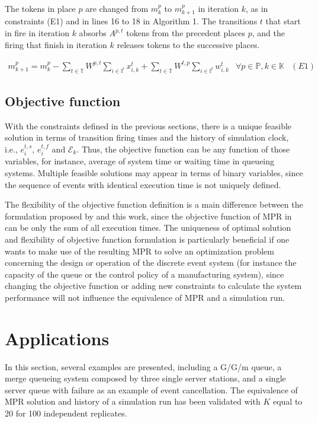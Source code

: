 \documentclass[suppldata]{interact}
\theoremstyle{plain}
\theoremstyle{definition}
\theoremstyle{remark}
\begin{document}
The tokens in place $p$ are changed from $m^{p}_{k}$ to $m^{p}_{k+1}$ in iteration $k$, as in constraints (E1) and in lines 16 to 18 in Algorithm 1. The transitions $t$ that start in fire in iteration $k$ absorbs $A^{p,t}$ tokens from the precedent places $p$, and the firing that finish in iteration $k$ releases tokens to the successive places. 

\begin{eqnarray}
	m^p_{k+1} = m^p_k - \sum_{t\in \mathbb{T}} W^{p,t} \sum_{i\in \mathbb{I}^{t}} x^t_{i,k} +  \sum_{t\in \mathbb{T}} W^{t,p} \sum_{i\in \mathbb{I}^{t}} w^t_{i,k} &\forall p\in \mathbb{P}, k\in \mathbb{K}& (E1) \nonumber
\end{eqnarray}

\subsection{Objective function}\label{sec:TPN_obj}
With the constraints defined in the previous sections, there is a unique feasible solution in terms of transition firing times and the history of simulation clock, i.e., $e^{t,s}_i$, $e^{t,f}_{i}$ and $\mathcal{E}_k$. Thus, the objective function can be any function of those variables, for instance, average of system time or waiting time in queueing systems. Multiple feasible solutions may appear in terms of binary variables, since the sequence of events with identical execution time is not uniquely defined.

The flexibility of the objective function definition is a main difference between the formulation proposed by \cite{chan2008optimization} and this work, since the objective function of MPR in \cite{chan2008optimization} can be only the sum of all execution times. The uniqueness of optimal solution and flexibility of objective function formulation is particularly beneficial if one wants to make use of the resulting MPR to solve an optimization problem concerning the design or operation of the discrete event system (for instance the capacity of the queue or the control policy of a manufacturing system), since changing the objective function or adding new constraints to calculate the system performance will not influence the equivalence of MPR and a simulation run. %


\section{Applications}
In this section, several examples are presented, including a G/G/m queue, a merge queueing system composed by three single server stations, and a single server queue with failure as an example of event cancellation. The equivalence of MPR solution and history of a simulation run has been validated with $K$ equal to 20 for 100 independent replicates. 
\end{document}
